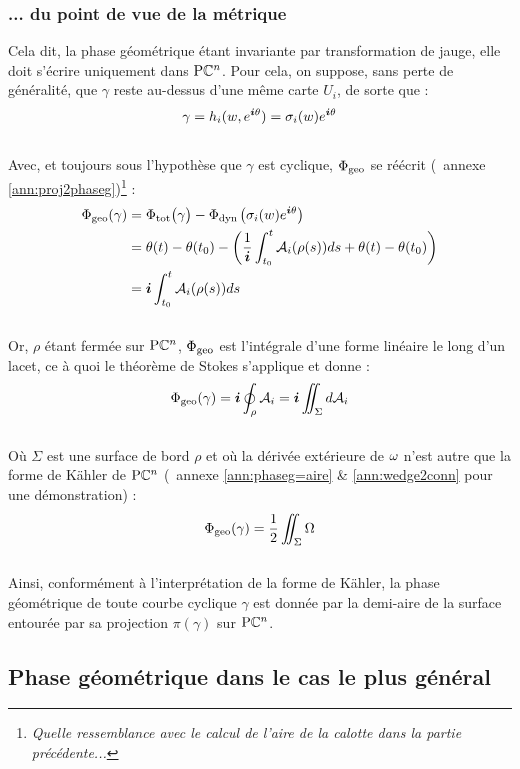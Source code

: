\subsubsection{... du point de vue de la métrique} \label{subsec:phase_g2aire}

Cela dit, la phase géométrique étant invariante par transformation de jauge, elle doit s'écrire uniquement dans $\text{\normalfont P}\mathbb{C}^{n}$. Pour cela, on suppose, sans perte de généralité, que $\gamma$ reste au-dessus d'une même carte $U_i$, de sorte que :
\[\gamma = h_i(w, e^{\boldsymbol{i} \theta}) = \sigma_i(w) e^{\boldsymbol{i} \theta}\]
\\
Avec, et toujours sous l'hypothèse que $\gamma$ est cyclique, $\Phi_{\text{\normalfont geo}}$ se réécrit (\cf~annexe \ref{ann:proj2phaseg})\footnote{\itshape
Quelle ressemblance avec le calcul de l'aire de la calotte dans la partie précédente...}
:
\begin{equation} \label{eq:phase_g=int2conn}
\begin{aligned}
	\Phi_{\text{\normalfont geo}}(\gamma) &= \Phi_{\text{\normalfont tot}}\big( \gamma \big) - \Phi_{\text{\normalfont dyn}\, }\big( \sigma_i(w) e^{\boldsymbol{i} \theta} \big) \\
	&= \theta(t) - \theta(t_0) - \left( \frac{1}{\boldsymbol{i}}\int_{t_0}^t \mathcal{A}_i(\rho(s)) ds + \theta(t) - \theta(t_0) \right) \\
	&= \boldsymbol{i} \int_{t_0}^t \mathcal{A}_i(\rho(s)) ds
\end{aligned}
\end{equation}
\\
Or, $\rho$ étant fermée sur $\text{\normalfont P}\mathbb{C}^{n}$, $\Phi_{\text{\normalfont geo}}$ est l'intégrale d'une forme linéaire le long d'un lacet, ce à quoi le théorème de Stokes s'applique et donne :
\[\Phi_{\text{\normalfont geo}}(\gamma) = \boldsymbol{i}\oint_\rho \mathcal{A}_i = \boldsymbol{i}\iint_\Sigma d \mathcal{A}_i\]
\\
Où $\Sigma$ est une surface de bord $\rho$ et où la dérivée extérieure de $\omega$ n'est autre que la forme de Kähler de $\text{\normalfont P}\mathbb{C}^{n}$ (\cf~annexe \ref{ann:phaseg=aire} \& \ref{ann:wedge2conn} pour une démonstration) :
\begin{equation} \label{eq:phaseg-aire2PC^n}
\Phi_{\text{\normalfont geo}}(\gamma) = \frac{1}{2} \iint_{\Sigma} \Omega 
\end{equation}
\\
Ainsi, conformément à l'interprétation de la forme de Kähler, la phase géométrique de toute courbe cyclique $\gamma$ est donnée par la demi-aire
de la surface entourée par sa projection $\pi(\gamma)$ sur $\text{\normalfont P}\mathbb{C}^{n}$.
\skipl



\subsection{Phase géométrique dans le cas le plus général} \label{subsec:phase_g-gene}

